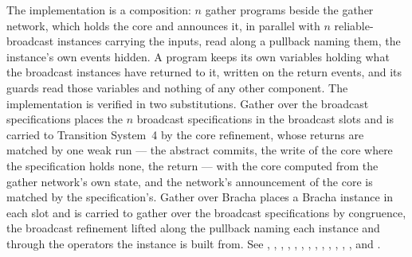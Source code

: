 The implementation is a composition: $n$ gather programs beside the gather network, which holds the core and announces it, in parallel with $n$ reliable-broadcast instances carrying the inputs, read along a pullback naming them, the instance's own events hidden.
A program keeps its own variables holding what the broadcast instances have returned to it, written on the return events, and its guards read those variables and nothing of any other component.
The implementation is verified in two substitutions.
Gather over the broadcast specifications places the $n$ broadcast specifications in the broadcast slots and is carried to Transition System~4 by the core refinement, whose returns are matched by one weak run --- the abstract commits, the write of the core where the specification holds none, the return --- with the core computed from the gather network's own state, and the network's announcement of the core is matched by the specification's.
Gather over Bracha places a Bracha instance in each slot and is carried to gather over the broadcast specifications by congruence, the broadcast refinement lifted along the pullback naming each instance and through the operators the instance is built from.
See ,
,
,
,
,
,
,
,
,
,
,
,
,
 and
.



